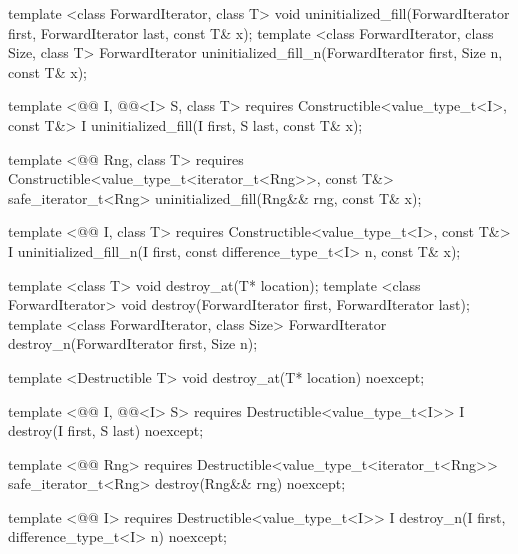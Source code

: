 {\color{remclr}
\begin{codeblock}
template <class ForwardIterator, class T>
  void uninitialized_fill(ForwardIterator first, ForwardIterator last,
                          const T& x);
template <class ForwardIterator, class Size, class T>
  ForwardIterator uninitialized_fill_n(ForwardIterator first, Size n, const T& x);
\end{codeblock}
} %
{\color{addclr}
\begin{codeblock}
template <@@ I, @@<I> S, class T>
  requires
Constructible<value_type_t<I>, const T&>
  I uninitialized_fill(I first, S last, const T& x);

template <@@ Rng, class T>
  requires
Constructible<value_type_t<iterator_t<Rng>>, const T&>
  safe_iterator_t<Rng> uninitialized_fill(Rng&& rng, const T& x);

template <@@ I, class T>
  requires
Constructible<value_type_t<I>, const T&>
  I uninitialized_fill_n(I first, const difference_type_t<I> n, const T& x);
\end{codeblock}
} %
{\color{remclr}
\begin{codeblock}
template <class T>
  void destroy_at(T* location);
template <class ForwardIterator>
  void destroy(ForwardIterator first, ForwardIterator last);
template <class ForwardIterator, class Size>
  ForwardIterator destroy_n(ForwardIterator first, Size n);
\end{codeblock}
} %
{\color{addclr}
\begin{codeblock}
template <Destructible T>
  void destroy_at(T* location) noexcept;

template <@@ I, @@<I> S>
  requires
Destructible<value_type_t<I>>
  I destroy(I first, S last) noexcept;

template <@@ Rng>
  requires
Destructible<value_type_t<iterator_t<Rng>>
  safe_iterator_t<Rng> destroy(Rng&& rng) noexcept;

template <@@ I>
  requires
Destructible<value_type_t<I>>
  I destroy_n(I first, difference_type_t<I> n) noexcept;
\end{codeblock}
} %

